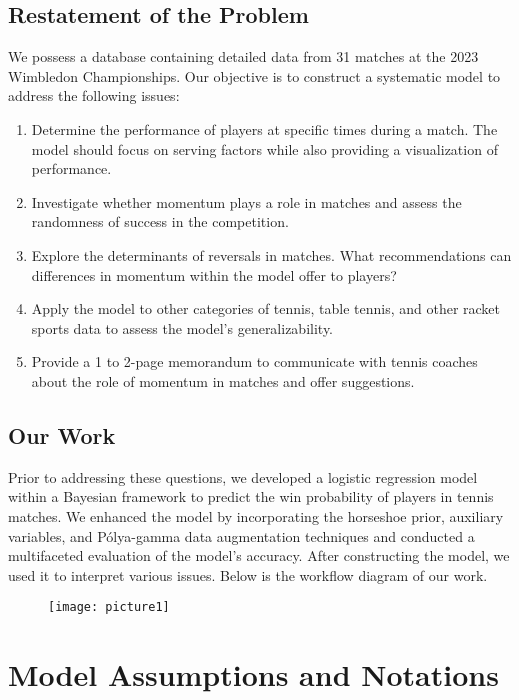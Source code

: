 \documentclass{mcmthesis}
\begin{document}
\subsection{Restatement of the Problem}
We possess a database containing detailed data from 31 matches at the 2023 Wimbledon Championships. Our objective is to construct a systematic model to address the following issues:

\begin{enumerate}
  \item Determine the performance of players at specific times during a match. The model should focus on serving factors while also providing a visualization of performance.
  \item Investigate whether momentum plays a role in matches and assess the randomness of success in the competition.
  \item Explore the determinants of reversals in matches. What recommendations can differences in momentum within the model offer to players?
  \item Apply the model to other categories of tennis, table tennis, and other racket sports data to assess the model's generalizability.
  \item Provide a 1 to 2-page memorandum to communicate with tennis coaches about the role of momentum in matches and offer suggestions.
\end{enumerate}

\subsection{Our Work}

Prior to addressing these questions, we developed a logistic regression model within a Bayesian framework to predict the win probability of players in tennis matches. We enhanced the model by incorporating the horseshoe prior, auxiliary variables, and Pólya-gamma data augmentation techniques and conducted a multifaceted evaluation of the model's accuracy. After constructing the model, we used it to interpret various issues. Below is the workflow diagram of our work.

\begin{figure}[ht]
  \small
  \centering
  \texttt{[image: picture1]}
\end{figure}

\newpage
\section{Model Assumptions and Notations}
\end{document}
